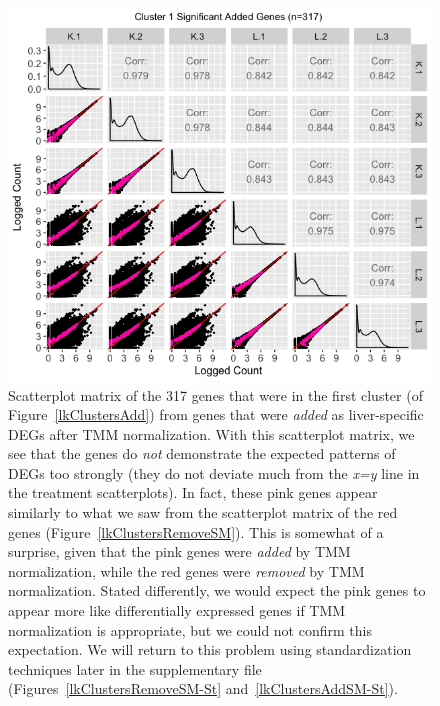 \documentclass{article}
\begin{document}
  \null
  \begin{figure}[t!]
  \centerline{\includegraphics[width=1\columnwidth]{../MakeFigures/lkClustersAddSM.jpg}}
  \caption{Scatterplot matrix of the 317 genes that were in the first cluster (of Figure~\ref{lkClustersAdd}) from genes that were \textit{added} as liver-specific DEGs after TMM normalization. With this scatterplot matrix, we see that the genes do \textit{not} demonstrate the expected patterns of DEGs too strongly (they do not deviate much from the \textit{x=y} line in the treatment scatterplots). In fact, these pink genes appear similarly to what we saw from the scatterplot matrix of the red genes (Figure~\ref{lkClustersRemoveSM}). This is somewhat of a surprise, given that the pink genes were \textit{added} by TMM  normalization, while the red genes were \textit{removed} by TMM normalization. Stated differently, we would expect the pink genes to appear more like differentially expressed genes if TMM normalization is appropriate, but we could not confirm this expectation. We will return to this problem using standardization techniques later in the supplementary file (Figures~\ref{lkClustersRemoveSM-St} and~\ref{lkClustersAddSM-St}).
  \label{lkClustersAddSM}}
  \end{figure}
  
\end{document}
